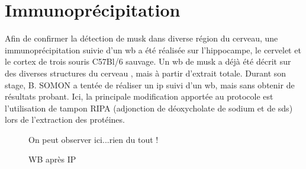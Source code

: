\section{Immunoprécipitation}
\label{sec:IPresultat}
Afin de confirmer la détection de \gls{musk} dans diverse région du cerveau, une immunoprécipitation suivie d'un \gls{wb} a été réalisée sur l'hippocampe, le cervelet et le cortex de trois souris C57Bl/6 sauvage. Un \gls{wb} de \gls{musk} a déjà été décrit sur des diverses structures du cerveau \cite{Garcia-Osta2006}, mais à partir d'extrait totale. Durant son stage, B. SOMON a tentée de réaliser un \gls{ip} suivi d'un \gls{wb}, mais sans obtenir de résultats probant. Ici, la principale modification apportée au protocole est l'utilisation de tampon RIPA (adjonction de déoxycholate de sodium et de \acrshort{sds}) lors de l'extraction des protéines.

\begin{figure}
	\caption{WB après IP}{On peut observer ici...rien du tout !}
	\label{fig:WBMuSK}
\end{figure}

